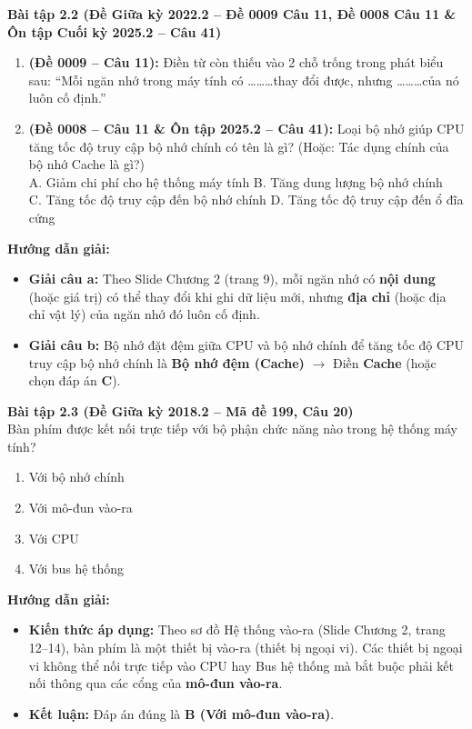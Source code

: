 \textbf{Bài tập 2.2 (Đề Giữa kỳ 2022.2 -- Đề 0009 Câu 11, Đề 0008 Câu 11 \& Ôn tập Cuối kỳ 2025.2 -- Câu 41)}
\begin{enumerate}[label=\alph*)]
    \item \textbf{(Đề 0009 -- Câu 11):} Điền từ còn thiếu vào 2 chỗ trống trong phát biểu sau: ``Mỗi ngăn nhớ trong máy tính có \dots\dots\dots thay đổi được, nhưng \dots\dots\dots của nó luôn cố định.''
    \item \textbf{(Đề 0008 -- Câu 11 \& Ôn tập 2025.2 -- Câu 41):} Loại bộ nhớ giúp CPU tăng tốc độ truy cập bộ nhớ chính có tên là gì? (Hoặc: Tác dụng chính của bộ nhớ Cache là gì?)\\
    A. Giảm chi phí cho hệ thống máy tính \quad B. Tăng dung lượng bộ nhớ chính\\
    C. Tăng tốc độ truy cập đến bộ nhớ chính \quad D. Tăng tốc độ truy cập đến ổ đĩa cứng
\end{enumerate}
\textbf{Hướng dẫn giải:}
\begin{itemize}
    \item \textbf{Giải câu a:} Theo Slide Chương 2 (trang 9), mỗi ngăn nhớ có \textbf{nội dung} (hoặc giá trị) có thể thay đổi khi ghi dữ liệu mới, nhưng \textbf{địa chỉ} (hoặc địa chỉ vật lý) của ngăn nhớ đó luôn cố định.
    \item \textbf{Giải câu b:} Bộ nhớ đặt đệm giữa CPU và bộ nhớ chính để tăng tốc độ CPU truy cập bộ nhớ chính là \textbf{Bộ nhớ đệm (Cache)} $\rightarrow$ Điền \textbf{Cache} (hoặc chọn đáp án \textbf{C}).
\end{itemize}

\textbf{Bài tập 2.3 (Đề Giữa kỳ 2018.2 -- Mã đề 199, Câu 20)}\\
Bàn phím được kết nối trực tiếp với bộ phận chức năng nào trong hệ thống máy tính?
\begin{enumerate}[label=\Alph*.]
    \item Với bộ nhớ chính
    \item Với mô-đun vào-ra
    \item Với CPU
    \item Với bus hệ thống
\end{enumerate}
\textbf{Hướng dẫn giải:}
\begin{itemize}
    \item \textbf{Kiến thức áp dụng:} Theo sơ đồ Hệ thống vào-ra (Slide Chương 2, trang 12--14), bàn phím là một thiết bị vào-ra (thiết bị ngoại vi). Các thiết bị ngoại vi không thể nối trực tiếp vào CPU hay Bus hệ thống mà bắt buộc phải kết nối thông qua các cổng của \textbf{mô-đun vào-ra}.
    \item \textbf{Kết luận:} Đáp án đúng là \textbf{B (Với mô-đun vào-ra)}.
\end{itemize}

